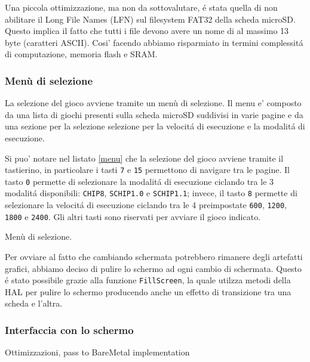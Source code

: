 \documentclass[a4paper]{article}
\begin{document}
Una piccola ottimizzazione, ma non da sottovalutare, é stata quella di non abilitare il Long File Names (LFN) sul filesystem FAT32 della scheda microSD. Questo implica il fatto che tutti i file devono avere un nome di al massimo 13 byte (caratteri ASCII). Cosi' facendo abbiamo risparmiato in termini complessitá di computazione, memoria flash e SRAM.

\subsubsection{Menù di selezione}

La selezione del gioco avviene tramite un menù di selezione. Il menu e' composto da una lista di giochi presenti sulla scheda microSD suddivisi in varie pagine e da una sezione per la selezione selezione per la velocitá di esecuzione e la modalitá di esecuzione.

Si puo' notare nel listato \ref{menu} che la selezione del gioco avviene tramite il tastierino, in particolare i tasti \texttt{7} e \texttt{15} permettono di navigare tra le pagine. Il tasto \texttt{0} permette di selezionare la modalitá di esecuzione ciclando tra le 3 modalitá disponibili: \texttt{CHIP8}, \texttt{SCHIP1.0} e \texttt{SCHIP1.1}; invece, il tasto \texttt{8} permette di selezionare la velocitá di esecuzione ciclando tra le 4 preimpostate \texttt{600}, \texttt{1200}, \texttt{1800} e \texttt{2400}. Gli altri tasti sono riservati per avviare il gioco indicato.

\begin{Listing}[h!t] %
    \centering
    \caption{Menù di selezione.}
    \label{menu}
\end{Listing}

Per ovviare al fatto che cambiando schermata potrebbero rimanere degli artefatti grafici, abbiamo deciso di pulire lo schermo ad ogni cambio di schermata. Questo é stato possibile grazie alla funzione \texttt{FillScreen}, la quale utilzza metodi della HAL per pulire lo schermo producendo anche un effetto di transizione tra una scheda e l'altra.

\subsubsection{Interfaccia con lo schermo}

Ottimizzazioni, pass to BareMetal implementation



\end{document}
